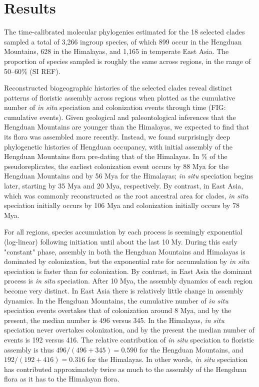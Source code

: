 \section{Results}

The time-calibrated molecular phylogenies estimated for the 18 selected clades sampled a total of 3,266 ingroup species, of which 899 occur in the Hengduan Mountains, 628 in the Himalayas, and 1,165 in temperate East Asia. The proportion of species sampled is roughly the same across regions, in the range of 50--60\% (SI REF).

Reconstructed biogeographic histories of the selected clades reveal distinct patterns of floristic assembly across regions when plotted as the cumulative number of \textit{in situ} speciation and colonization events through time (FIG: cumulative events). Given geological and paleontological inferences that the Hengduan Mountains are younger than the Himalayas, we expected to find that its flora was assembled more recently. Instead, we found surprisingly deep phylogenetic histories of Hengduan occupancy, with initial assembly of the Hengduan Mountains flora pre-dating that of the Himalayas. In \% of the pseudoreplicates, the earliest colonization event occurs by 88 Mya for the Hengduan Mountains and by 56 Mya for the Himalayas; \textit{in situ} speciation begins later, starting by 35 Mya and 20 Mya, respectively. By contrast, in East Asia, which was commonly reconstructed as the root ancestral area for clades, \textit{in situ} speciation initially occurs by 106 Mya and colonization initially occurs by 78 Mya.

For all regions, species accumulation by each process is seemingly exponential (log-linear) following initiation until about the last 10 My. During this early "constant" phase, assembly in both the Hengduan Mountains and Himalayas is dominated by colonization, but the exponential rate for accumulation by \textit{in situ} speciation is faster than for colonization. By contrast, in East Asia the dominant process is \textit{in situ} speciation.  After 10 Mya, the assembly dynamics of each region become very distinct. In East Asia there is relatively little change in assembly dynamics. In the Hengduan Mountains, the cumulative number of \textit{in situ} speciation events overtakes that of colonization around 8 Mya, and by the present, the median number is 496 versus 345. In the Himalayas, \textit{in situ} speciation never overtakes colonization, and by the present the median number of events is 192 versus 416. The relative contribution of \textit{in situ} speciation to floristic assembly is thus $496/(496+345) = 0.590$ for the Hengduan Mountains, and $192/(192+416) = 0.316$ for the Himalayas. In other words, \textit{in situ} speciation has contributed approximately twice as much to the assembly of the Hengduan flora as it has to the Himalayan flora.

